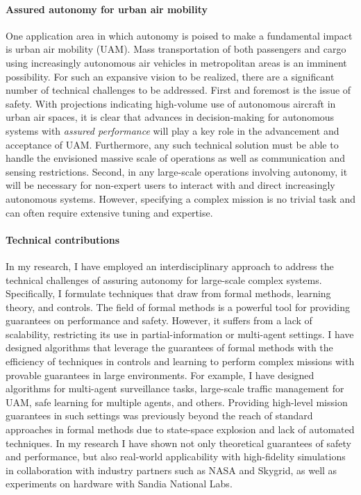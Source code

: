 \paragraph{Assured autonomy for urban air mobility} One application area in which autonomy is poised to make a fundamental impact is urban air mobility (UAM). Mass transportation of both passengers and cargo using increasingly autonomous air vehicles in metropolitan areas is an imminent possibility. For such an expansive vision to be realized, there are a significant number of technical challenges to be addressed.  First and foremost is the issue of safety. With projections indicating high-volume use of autonomous aircraft in urban air spaces, it is clear that advances in decision-making for autonomous systems with \emph{assured performance} will play a key role in the advancement and acceptance of UAM. Furthermore, any such technical solution must be able to handle the envisioned massive scale of operations as well as communication and sensing restrictions. Second, in any large-scale operations involving autonomy, it will be necessary for non-expert users to interact with and direct increasingly autonomous systems. However, specifying a complex mission is no trivial task and can often require extensive tuning and expertise.


\paragraph{Technical contributions} In my research, I have employed an interdisciplinary approach to address the technical challenges of assuring autonomy for large-scale complex systems. Specifically, I formulate techniques that draw from formal methods, learning theory, and controls. The field of formal methods is a powerful tool for providing guarantees on performance and safety. However, it suffers from a lack of scalability, restricting its use in partial-information or multi-agent settings. I have designed algorithms that leverage the guarantees of formal methods with the efficiency of techniques in controls and learning to perform complex missions with provable guarantees in large environments. For example, I have designed algorithms for multi-agent surveillance tasks, large-scale traffic management for UAM, safe learning for multiple agents, and others. Providing high-level mission guarantees in such settings was previously beyond the reach of standard approaches in formal methods due to state-space explosion and lack of automated techniques. In my research I have shown not only theoretical guarantees of safety and performance, but also real-world applicability with high-fidelity simulations in collaboration with industry partners such as NASA and Skygrid, as well as experiments on hardware with Sandia National Labs.
